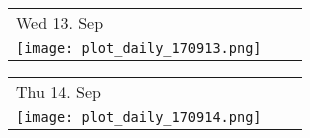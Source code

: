\newpage

\begin{tabularx}{\linewidth}{YYY}
Wed 13. Sep\\
\texttt{[image: plot\_daily\_170913.png]}
\end{tabularx}

\begin{tabularx}{\linewidth}{YYY}
Thu 14. Sep\\
\texttt{[image: plot\_daily\_170914.png]}
\end{tabularx}

